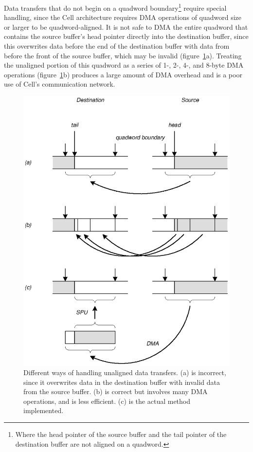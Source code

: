 Data transfers that do not begin on a quadword boundary\footnote{Where the head pointer of the source buffer and the tail pointer of the destination buffer are not aligned on a quadword.} require special handling, since the Cell architecture requires DMA operations of quadword size or larger to be quadword-aligned. It is not safe to DMA the entire quadword that contains the source buffer's head pointer directly into the destination buffer, since this overwrites data before the end of the destination buffer with data from before the front of the source buffer, which may be invalid (figure~\ref{fig:lib:dtua}a). Treating the unaligned portion of this quadword as a series of 1-, 2-, 4-, and 8-byte DMA operations (figure~\ref{fig:lib:dtua}b) produces a large amount of DMA overhead and is a poor use of Cell's communication network.

\begin{figure}[!htb]
\begin{center}
\includegraphics{figs/dt}
\end{center}
\caption[Different ways of handling unaligned data transfers.]{Different ways of handling unaligned data transfers. (a) is incorrect, since it overwrites data in the destination buffer with invalid data from the source buffer. (b) is correct but involves many DMA operations, and is less efficient. (c) is the actual method implemented.}
\label{fig:lib:dtua}
\end{figure}

